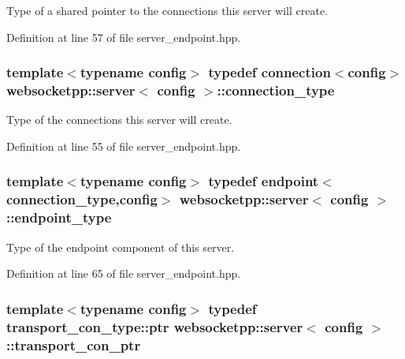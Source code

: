 Type of a shared pointer to the connections this server will create. 



Definition at line 57 of file server\+\_\+endpoint.\+hpp.

\hypertarget{classwebsocketpp_1_1server_a82d3d94b70a49b2073c9b3378ec7047c}{}
\subsubsection[{connection\+\_\+type}]{\setlength{\rightskip}{0pt plus 5cm}template$<$typename config$>$ typedef {\bf connection}$<$config$>$ {\bf websocketpp\+::server}$<$ config $>$\+::{\bf connection\+\_\+type}}\label{classwebsocketpp_1_1server_a82d3d94b70a49b2073c9b3378ec7047c}


Type of the connections this server will create. 



Definition at line 55 of file server\+\_\+endpoint.\+hpp.

\hypertarget{classwebsocketpp_1_1server_a40f4d4bb132daf5164ccc290e9dbceb7}{}
\subsubsection[{endpoint\+\_\+type}]{\setlength{\rightskip}{0pt plus 5cm}template$<$typename config$>$ typedef {\bf endpoint}$<${\bf connection\+\_\+type},config$>$ {\bf websocketpp\+::server}$<$ config $>$\+::{\bf endpoint\+\_\+type}}\label{classwebsocketpp_1_1server_a40f4d4bb132daf5164ccc290e9dbceb7}


Type of the endpoint component of this server. 



Definition at line 65 of file server\+\_\+endpoint.\+hpp.

\hypertarget{classwebsocketpp_1_1server_af23763a1899c4636299f59f130570aab}{}
\subsubsection[{transport\+\_\+con\+\_\+ptr}]{\setlength{\rightskip}{0pt plus 5cm}template$<$typename config$>$ typedef transport\+\_\+con\+\_\+type\+::ptr {\bf websocketpp\+::server}$<$ config $>$\+::{\bf transport\+\_\+con\+\_\+ptr}}\label{classwebsocketpp_1_1server_af23763a1899c4636299f59f130570aab}


